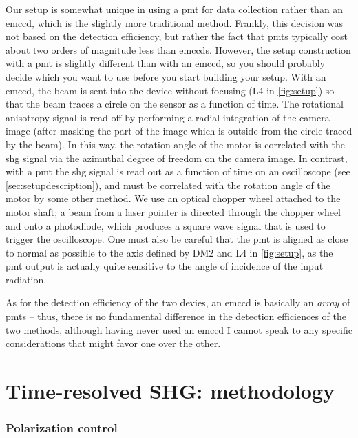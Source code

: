 Our setup is somewhat unique in using a \gls{pmt} for data collection rather than an \gls{emccd}, which is the slightly more traditional method.
Frankly, this decision was not based on the detection efficiency, but rather the fact that \glspl{pmt} typically cost about two orders of magnitude less than \glspl{emccd}.
However, the setup construction with a \gls{pmt} is slightly different than with an \gls{emccd}, so you should probably decide which you want to use before you start building your setup.
With an \gls{emccd}, the beam is sent into the device without focusing (L4 in \cref{fig:setup}) so that the beam traces a circle on the sensor as a function of time\cite{harter_high-speed_2015}.
The rotational anisotropy signal is read off by performing a radial integration of the camera image (after masking the part of the image which is outside from the circle traced by the beam).
In this way, the rotation angle of the motor is correlated with the \gls{shg} signal via the azimuthal degree of freedom on the camera image.
In contrast, with a \gls{pmt} the \gls{shg} signal is read out as a function of time on an oscilloscope (see \cref{sec:setupdescription}), and must be correlated with the rotation angle of the motor by some other method.
We use an optical chopper wheel attached to the motor shaft; a beam from a laser pointer is directed through the chopper wheel and onto a photodiode, which produces a square wave signal that is used to trigger the oscilloscope.
One must also be careful that the \gls{pmt} is aligned as close to normal as possible to the axis defined by DM2 and L4 in \cref{fig:setup}, as the \gls{pmt} output is actually quite sensitive to the angle of incidence of the input radiation.

As for the detection efficiency of the two devies, an \gls{emccd} is basically an \emph{array} of \glspl{pmt} -- thus, there is no fundamental difference in the detection efficiences of the two methods, although having never used an \gls{emccd} I cannot speak to any specific considerations that might favor one over the other.

\section{Time-resolved SHG: methodology}

\subsubsection{Polarization control}

